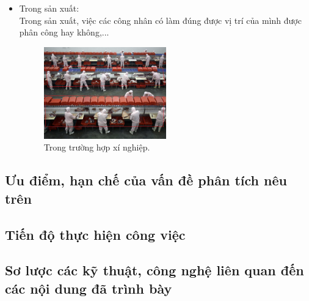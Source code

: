 \begin{flushleft}
\begin{itemize}
        \item Trong sản xuất:\\
        Trong sản xuất, việc các công nhân có làm đúng được vị trí của mình được phân công hay không,...
        \begin{figure}[htbp]
            \centering
            \includegraphics[width=0.5\textwidth]{images/TH3.jpg}
            \caption{Trong trường hợp xí nghiệp.}
            \label{fig:img_3_XN}
        \end{figure}
    \end{itemize}
    

    
    \subsection{Ưu điểm, hạn chế của vấn đề phân tích nêu trên}
    \subsection{Tiến độ thực hiện công việc}
    \subsection{Sơ lược các kỹ thuật, công nghệ liên quan đến các nội dung đã trình bày}
\end{flushleft}